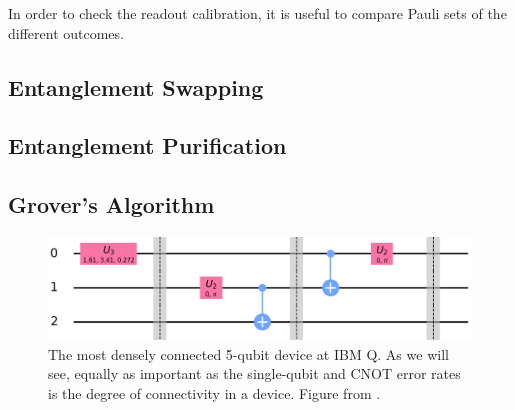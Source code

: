 In order to check the readout calibration, it is useful to compare Pauli sets of
the different outcomes. 

\subsection{Entanglement Swapping}
\subsection{Entanglement Purification}
\subsection{Grover's Algorithm}

\begin{figure} \centering
\includegraphics[width=\textwidth]{images/teleport_ibmqx2.png}
  \caption{The most densely connected 5-qubit device at IBM Q. As we will see,
equally as important as the single-qubit and CNOT error rates is the degree of
connectivity in a device. Figure from \cite{ibmq_yorktown}.}
  \label{fig:yorktown_connections}
\end{figure}

